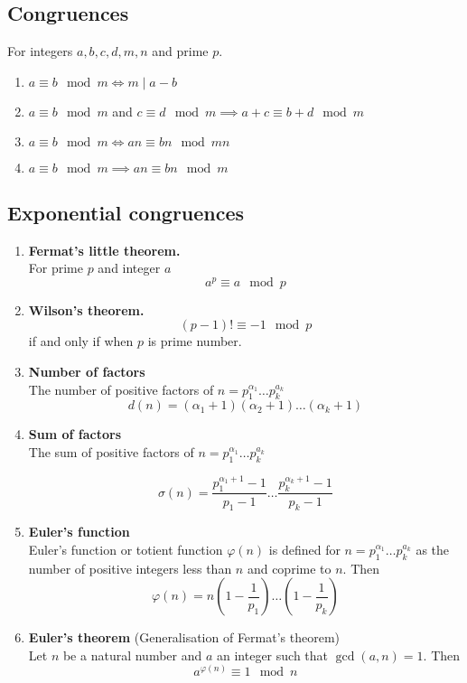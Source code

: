 \documentclass{article}
\begin{document}
  \subsection{Congruences}
    For integers $a,b,c,d,m,n$ and prime $p$.
    \begin{enumerate}
      \item
      $a \equiv b \mod m \iff m \mid a-b $
      \item
      $a\equiv b \mod m$ and $ c\equiv d \mod m \implies a+c\equiv b+d \mod m$
      \item
      $a \equiv b \mod m \iff an \equiv bn \mod mn$
      \item
      $a \equiv b \mod m \implies an \equiv bn \mod m$
    \end{enumerate}
  \subsection{Exponential congruences}
    \begin{enumerate}
    \item
    \textbf{Fermat's little theorem.} \\
    For prime $p$ and integer $a$
    $$a^p \equiv a \mod p$$

    \item
    \textbf{Wilson's theorem.} \\
    $$(p-1)! \equiv -1 \mod p$$
    if and only if when $p$ is prime number.

    \item
    \textbf{Number of factors} \\
    The number of positive factors of $n=p_1^{\alpha_1} \dots p_k^{a_k}$
    $$d(n)= (\alpha_1+1)(\alpha_2+1)\dots (\alpha_k+1)$$
    \item
    \textbf{Sum of factors} \\
    The sum of positive factors of $n=p_1^{\alpha_1} \dots p_k^{a_k}$

    $$\sigma(n)= \frac{p_1^{\alpha_1+1}-1}{p_1-1} \dots  \frac{p_k^{\alpha_k+1}-1}{p_k-1}$$

    \item
    \textbf{Euler's function} \\
    Euler’s function or totient function $\varphi(n)$ is defined for $n=p_1^{\alpha_1} \dots p_k^{a_k}$ as the number
    of positive integers less than $n$ and coprime to $n$. Then
    $$\varphi(n) = n \left(1-\frac{1}{p_1}\right) \dots  \left(1-\frac{1}{p_k}\right)$$

    \item
    \textbf{Euler's theorem}  (Generalisation of Fermat's theorem)\\
    Let $n$ be a natural number and $a$ an integer such that $\gcd(a,n)=1$. Then
    $$a^{\varphi(n)} \equiv 1 \mod n $$
    \end{enumerate}
\newpage
\end{document}
